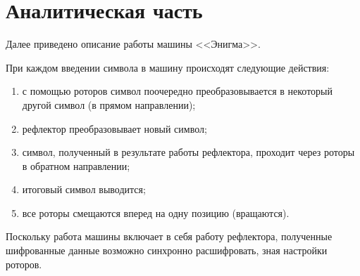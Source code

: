 \section{Аналитическая часть}

Далее приведено описание работы машины <<Энигма>>.

При каждом введении символа в машину происходят следующие действия:

\begin{enumerate}
	\item с помощью роторов символ поочередно преобразовывается в некоторый другой символ (в прямом направлении);
	\item рефлектор преобразовывает новый символ;
	\item символ, полученный в результате работы рефлектора, проходит через роторы в обратном направлении;
	\item итоговый символ выводится;
	\item все роторы смещаются вперед на одну позицию (вращаются).
\end{enumerate}

Поскольку работа машины включает в себя работу рефлектора, полученные шифрованные данные возможно синхронно расшифровать, зная настройки роторов.
